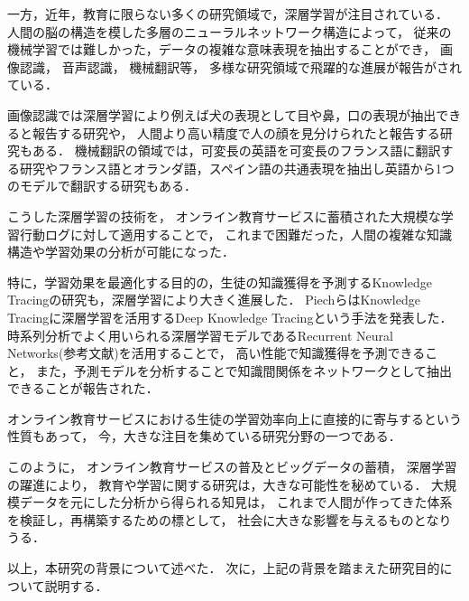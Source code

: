 一方，近年，教育に限らない多くの研究領域で，深層学習が注目されている．
人間の脳の構造を模した多層のニューラルネットワーク構造によって，
従来の機械学習では難しかった，データの複雑な意味表現を抽出することができ，
画像認識\cite{schroff2015facenet,szegedy2014going}，
音声認識\cite{hinton2012deep, bahdanau2015end}，
機械翻訳\cite{sutskever2014sequence, dong2015multi}等，
多様な研究領域で飛躍的な進展が報告がされている．

画像認識では深層学習により例えば犬の表現として目や鼻，口の表現が抽出できると報告する研究\cite{zeiler2014visualizing}や，
人間より高い精度で人の顔を見分けられたと報告する研究\cite{schroff2015facenet}もある．
機械翻訳の領域では，可変長の英語を可変長のフランス語に翻訳する研究\cite{sutskever2014sequence}やフランス語とオランダ語，スペイン語の共通表現を抽出し英語から1つのモデルで翻訳する研究もある\cite{dong2015multi}．



こうした深層学習の技術を，
オンライン教育サービスに蓄積された大規模な学習行動ログに対して適用することで，
これまで困難だった，人間の複雑な知識構造や学習効果の分析が可能になった．

特に，学習効果を最適化する目的の，生徒の知識獲得を予測するKnowledge Tracingの研究も，深層学習により大きく進展した．
PiechらはKnowledge Tracingに深層学習を活用するDeep Knowledge Tracingという手法を発表した\cite{piech2015deep}．
時系列分析でよく用いられる深層学習モデルであるRecurrent Neural Networks(参考文献)を活用することで，
高い性能で知識獲得を予測できること，
また，予測モデルを分析することで知識間関係をネットワークとして抽出できることが報告された．

オンライン教育サービスにおける生徒の学習効率向上に直接的に寄与するという性質もあって，
今，大きな注目を集めている研究分野の一つである．


このように，
オンライン教育サービスの普及とビッグデータの蓄積，
深層学習の躍進により，
教育や学習に関する研究は，大きな可能性を秘めている．
大規模データを元にした分析から得られる知見は，
これまで人間が作ってきた体系を検証し，再構築するための標として，
社会に大きな影響を与えるものとなりうる．



\vvspace
以上，本研究の背景について述べた．
次に，上記の背景を踏まえた研究目的について説明する．

